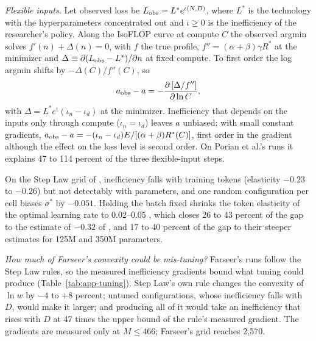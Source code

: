 \textit{Flexible inputs.}\label{app:add-flexible} Let observed loss be $L_{\rm obs}=L^*e^{\iota(N,D)}$, where $L^*$ is the
technology with the hyperparameters concentrated out and $\iota\ge0$ is the inefficiency of the researcher's policy. Along
the IsoFLOP curve at compute $C$ the observed argmin solves $f'(n)+\Delta(n)=0$, with $f$ the true profile, $f''=(\alpha+\beta)\gamma R^*$
at the minimizer and $\Delta\equiv\partial(L_{\rm obs}-L^*)/\partial n$ at fixed compute. To first order the log argmin
shifts by $-\Delta(C)/f''(C)$, so
\begin{equation}\label{eq:app-flexbias}
a_{\rm obs}-a=-\frac{\partial\,[\Delta/f'']}{\partial\ln C},
\end{equation}
with $\Delta=L^*e^{\iota}(\iota_n-\iota_d)$ at the minimizer. Inefficiency that depends on the inputs only through compute
($\iota_n=\iota_d$) leaves $a$ unbiased; with small constant gradients,
$a_{\rm obs}-a=-(\iota_n-\iota_d)E/[(\alpha+\beta)R^*(C)]$, first order in the gradient although the effect on the loss level
is second order. On Porian et al.'s runs it explains 47 to 114 percent of the three flexible-input steps.

On the Step Law grid of \citet{li2025predictablea}, inefficiency falls with training tokens (elasticity $-0.23$ to $-0.26$) but not detectably with parameters,
and one random configuration per cell biases $\sigma^*$ by $-0.051$. Holding the batch fixed shrinks the token elasticity of
the optimal learning rate to 0.02--0.05 \citep[the conditional demand of][]{milgrom1996lechatelier}, which closes 26 to 43
percent of the gap to the estimate of $-0.32$ of \citet{bjorck2024scaling}, and 17 to 40 percent of the gap to their steeper
estimates for 125M and 350M parameters.

\textit{How much of Farseer's convexity could be mis-tuning?} Farseer's runs follow the Step Law rules, so the measured
inefficiency gradients bound what tuning could produce (Table~\ref{tab:app-tuning}). Step Law's own rule changes the
convexity of $\ln w$ by $-4$ to $+8$ percent; untuned configurations, whose inefficiency falls with $D$, would make it larger;
and producing all of it would take an inefficiency that rises with $D$ at 47 times the upper bound of the rule's measured
gradient. The gradients are measured only at $M\le466$; Farseer's grid reaches 2,570.

\FloatBarrier%
